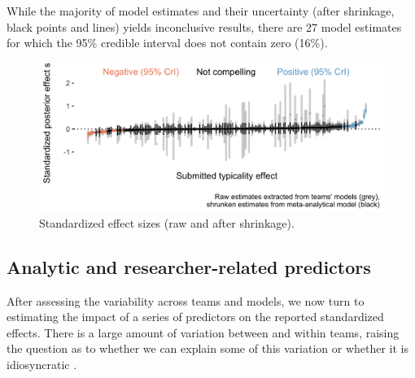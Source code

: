 \documentclass[Review,times,sageh]{sagej}
\begin{document}
While the majority of model estimates and their uncertainty (after shrinkage, black points and lines) yields inconclusive results, there are 27 model estimates for which the 95\% credible interval does not contain zero (16\%).

\begin{figure}
\includegraphics[width=1\linewidth]{../figs/meta_plot1_shrinkage} \caption{Standardized effect sizes (raw and after shrinkage).}\label{fig:plot-meta1}
\end{figure}

\hypertarget{analytic-and-researcher-related-predictors}{%
\subsection{Analytic and researcher-related predictors}\label{analytic-and-researcher-related-predictors}}

After assessing the variability across teams and models, we now turn to estimating the impact of a series of predictors on the reported standardized effects.
There is a large amount of variation between and within teams, raising the question as to whether we can explain some of this variation or whether it is idiosyncratic \citep{breznau2021observing}.
\end{document}
